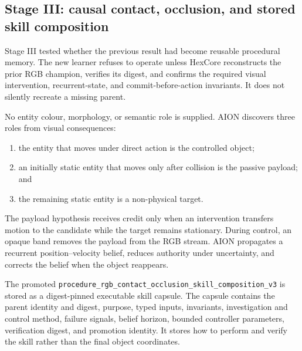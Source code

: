 \subsection{Stage III: causal contact, occlusion, and stored skill composition}

Stage III tested whether the previous result had become reusable procedural
memory.  The new learner refuses to operate unless HexCore reconstructs the
prior RGB champion, verifies its digest, and confirms the required visual
intervention, recurrent-state, and commit-before-action invariants.  It does
not silently recreate a missing parent.

No entity colour, morphology, or semantic role is supplied.  AION discovers
three roles from visual consequences:
\begin{enumerate}[leftmargin=*]
  \item the entity that moves under direct action is the controlled object;
  \item an initially static entity that moves only after collision is the
        passive payload; and
  \item the remaining static entity is a non-physical target.
\end{enumerate}
The payload hypothesis receives credit only when an intervention transfers
motion to the candidate while the target remains stationary.  During control,
an opaque band removes the payload from the RGB stream.  AION propagates a
recurrent position--velocity belief, reduces authority under uncertainty, and
corrects the belief when the object reappears.

The promoted
\texttt{procedure\_rgb\_contact\_occlusion\_skill\_composition\_v3} is stored
as a digest-pinned executable skill capsule.  The capsule contains the parent
identity and digest, purpose, typed inputs, invariants, investigation and
control method, failure signals, belief horizon, bounded controller
parameters, verification digest, and promotion identity.  It stores how to
perform and verify the skill rather than the final object coordinates.

